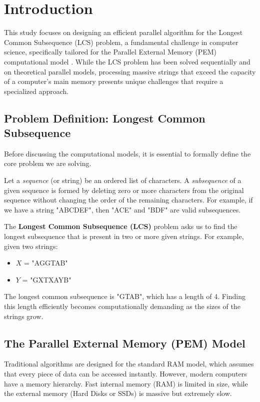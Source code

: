 
\chapter{Introduction}
\vspace{-5mm}

This study focuses on designing an efficient parallel algorithm for the Longest Common Subsequence (LCS) problem, a fundamental challenge in computer science, specifically tailored for the Parallel External Memory (PEM) computational model \cite{sajith-spem-23}. While the LCS problem has been solved sequentially and on theoretical parallel models, processing massive strings that exceed the capacity of a computer's main memory presents unique challenges that require a specialized approach.

\section{Problem Definition: Longest Common Subsequence}
Before discussing the computational models, it is essential to formally define the core problem we are solving. 

Let a \textit{sequence} (or string) be an ordered list of characters. A \textit{subsequence} of a given sequence is formed by deleting zero or more characters from the original sequence without changing the order of the remaining characters. For example, if we have a string "ABCDEF", then "ACE" and "BDF" are valid subsequences.

The \textbf{Longest Common Subsequence (LCS)} problem asks us to find the longest subsequence that is present in two or more given strings\cite{clrs-ia-09}. 
For example, given two strings:
\begin{itemize}
    \item $X$ = "AGGTAB"
    \item $Y$ = "GXTXAYB"
\end{itemize}
The longest common subsequence is "GTAB", which has a length of 4. Finding this length efficiently becomes computationally demanding as the sizes of the strings grow.

\section{The Parallel External Memory (PEM) Model}
Traditional algorithms are designed for the standard RAM model, which assumes that every piece of data can be accessed instantly. However, modern computers have a memory hierarchy. Fast internal memory (RAM) is limited in size, while the external memory (Hard Disks or SSDs) is massive but extremely slow. 


